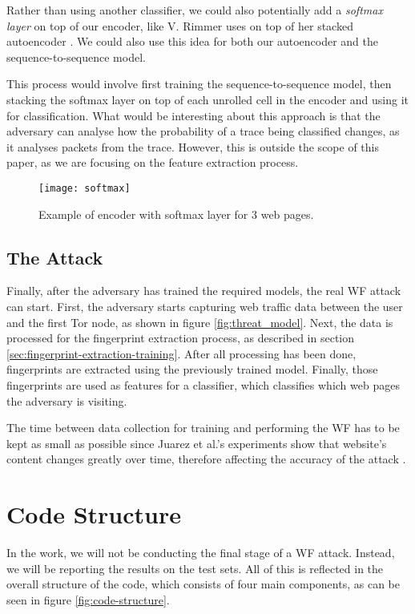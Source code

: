 Rather than using another classifier, we could also potentially add a \textit{softmax layer} on top of our encoder, like V. Rimmer uses on top of her stacked autoencoder \cite{deeplearningthesis}.
We could also use this idea for both our autoencoder and the sequence-to-sequence model.

This process would involve first training the sequence-to-sequence model, then stacking the softmax layer on top of each unrolled cell in the encoder and using it for classification.
What would be interesting about this approach is that the adversary can analyse how the probability of a trace being classified changes, as it analyses packets from the trace.
However, this is outside the scope of this paper, as we are focusing on the feature extraction process.

\begin{figure}[ht]
  \centering
  \texttt{[image: softmax]}
  \caption{Example of encoder with softmax layer for 3 web pages.}
  \label{fig:softmax}
\end{figure}

\newpage

\subsection{The Attack}

Finally, after the adversary has trained the required models, the real WF attack can start.
First, the adversary starts capturing web traffic data between the user and the first Tor node, as shown in figure \ref{fig:threat_model}.
Next, the data is processed for the fingerprint extraction process, as described in section \ref{sec:fingerprint-extraction-training}.
After all processing has been done, fingerprints are extracted using the previously trained model.
Finally, those fingerprints are used as features for a classifier, which classifies which web pages the adversary is visiting.

The time between data collection for training and performing the WF has to be kept as small as possible since Juarez et al.'s experiments show that website's content changes greatly over time, therefore affecting the accuracy of the attack \cite{wfpevaluation}.

\section{Code Structure} \label{sec:code-structure}

In the work, we will not be conducting the final stage of a WF attack.
Instead, we will be reporting the results on the test sets.
All of this is reflected in the overall structure of the code, which consists of four main components, as can be seen in figure \ref{fig:code-structure}.


